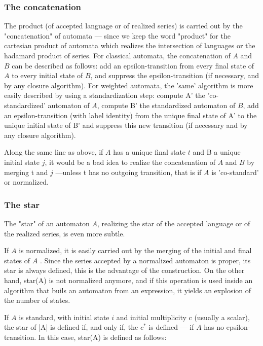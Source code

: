 \subsubsection{The concatenation}

The product (of accepted language or of realized series) is carried
out by the "concatenation" of automata --- since we keep the word
"product" for the cartesian product of automata which realizes the
intersection of languages or the hadamard product of series. For
classical automata, the concatenation of $A$ and $B$ can be described as
follows: add an epsilon-transition from every final state of $A$ to
every initial state of $B$, and suppress the epsilon-transition (if
necessary, and by any closure algorithm). For weighted automata, the
'same' algorithm is more easily described by using a standardization
step: compute A' the 'co-standardized' automaton of $A$, compute B' the
standardized automaton of $B$, add an epsilon-transition (with label
identity) from the unique final state of A' to the unique initial
state of B' and suppress this new transition (if necessary and by any
closure algorithm).

\begin{remark}
  Along the same line as above, if $A$ has a unique final state $t$ and
  B a unique initial state $j$, it would be a bad idea to realize the
  concatenation of $A$ and $B$ by merging t and $j$ ---unless t has no
  outgoing transition, that is if $A$ is 'co-standard' or normalized.
\end{remark}


\subsubsection{The star}

The "star" of an automaton $A$, realizing the star of the accepted
language or of the realized series, is even more subtle.

If $A$ is normalized, it is easily carried out by the merging of the
initial and final states of $A$ . Since the series accepted by a
normalized automaton is proper, its star is always defined, this is
the advantage of the construction. On the other hand, star(A) is not
normalized anymore, and if this operation is used inside an algorithm
that buils an automaton from an expression, it yields an explosion of
the number of states.

If $A$ is standard, with initial state $i$ and initial multiplicity c
(usually a scalar), the star of |A| is defined if, and only if, the
$c^{*}$ is defined \cite[Prop. III.2.6]{sakarovitch.03.eta} --- if $A$ has
no epsilon-transition.  In this case, star(A) is defined as follows:

